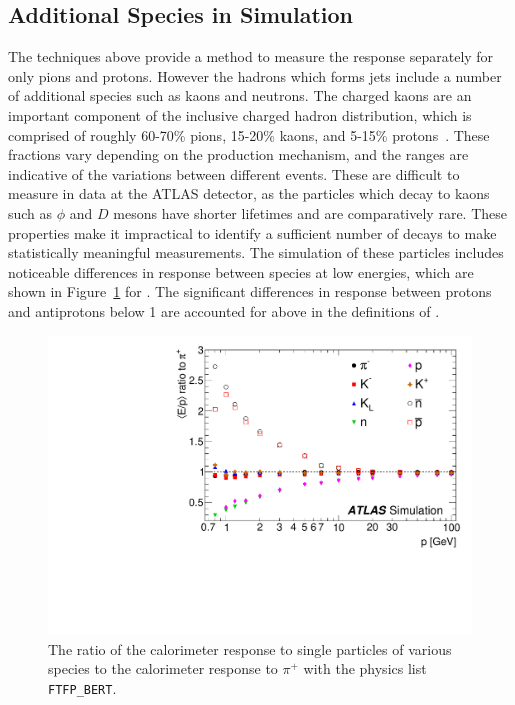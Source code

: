\subsection{Additional Species in Simulation}

The techniques above provide a method to measure the response separately for only pions and protons. 
However the hadrons which forms jets include a number of additional species such as kaons and neutrons. 
The charged kaons are an important component of the inclusive charged hadron distribution, which is comprised of roughly 60-70\% pions, 15-20\% kaons, and 5-15\% protons~\cite{PERF-2015-05}.
These fractions vary depending on the production mechanism, and the ranges are indicative of the variations between different events.
These are difficult to measure in data at the ATLAS detector, as the particles which decay to kaons such as $\phi$ and $D$ mesons have shorter lifetimes and are comparatively rare. 
These properties make it impractical to identify a sufficient number of decays to make statistically meaningful measurements.
The simulation of these particles includes noticeable differences in response between species at low energies, which are shown in Figure~\ref{fig:simulated_response} for \FTFP.
The significant differences in response between protons and antiprotons below 1 \GeV are accounted for above in the definitions of \Ea. 

\begin{figure}[htbp]
\centering
\includegraphics[width=\fullfig]{figures/simulated_response.pdf}
\caption{The ratio of the calorimeter response to single particles of various species to the calorimeter response to $\pi^+$ with the physics list \texttt{FTFP\_BERT}.}
\label{fig:simulated_response}
\end{figure}

